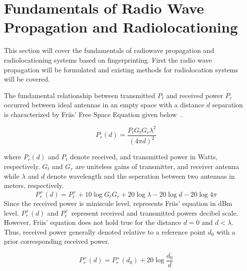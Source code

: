 \section{\label{sec-FU}Fundamentals of Radio Wave Propagation and Radiolocationing}
    This section will cover the fundamentals of radiowave propagation and radiolocationing systems based on fingerprinting.
    First the radio wave propagation will be formulated and existing methods for radiolocation systems will be covered.

    The fundamental relationship between transmitted $P_t$ and received power $P_r$ occurred between ideal antennas in an empty space with a distance $d$ separation is characterized by Friis' Free Space Equation given below~\cite{friis1946note}.

    \begin{equation}
        \label{eq:friisWatts}
            P_r(d) = \dfrac{P_t  G_t  G_r \lambda^2}{{\left(4 \pi d\right)}^2}
    \end{equation}

    \noindent where $P_r(d)$ and $P_t$ denote received, and transmitted power in Watts, respectively.
    $G_t$ and $G_r$ are uniteless gains of transmitter, and receiver antenna while $\lambda$ and $d$ denote wavelength and the seperation between two antennas in meters, respectively.
    \begin{equation}
        \label{eq:friisdBm}
        P^{+}_r(d) = P^{+}_t + 10 \log{G_t G_r} + 20 \log{\lambda} - 20 \log{d} - 20 \log{4 \pi}
    \end{equation}
    Since the received power is miniscule level,  represents Friis' equation in dBm level.
    $P^{+}_r(d)$ and $P^{+}_t$ represent received and transmitted powers decibel scale.
    However, Friis' equation does not hold true for the distance $d = 0$ and $d<\lambda$.
    Thus, received power generally denoted relative to a reference point $d_0$ with a prior corresponding received power.

    \begin{equation}
        \label{eq:friisRef}
        P^{+}_r(d) = P^{+}_r(d_0) + 20 \log{\dfrac{d_0}{d}}
    \end{equation}


